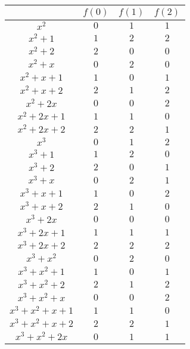 \documentclass{article}
\begin{document}
\begin{table}[h]
    \centering
    \begin{tabular}{|c|c|c|c|}
        \hline 
         & $f(0)$ & $f(1)$ & $f(2)$ \\ 
        \hline 
        $x^2$ & $0$ & $1$ & $1$ \\
        \hline 
        $x^2+1$ & $1$ & $2$ & $2$ \\
        \hline 
        $x^2+2$ & $2$ & $0$ & $0$ \\
        \hline       
        $x^2+x$ & $0$ & $2$ & $0$ \\
        \hline 
        $x^2+x+1$ & $1$ & $0$ & $1$ \\
        \hline
        $x^2+x+2$ & $2$ & $1$ & $2$ \\
        \hline 
        $x^2+2x$ & $0$ & $0$ & $2$ \\ 
        \hline
        $x^2+2x+1$ & $1$ & $1$ & $0$ \\
        \hline 
        $x^2+2x+2$ & $2$ & $2$ & $1$ \\
        \hline 
        $x^3$ & $0$ & $1$ & $2$ \\
        \hline
        $x^3+1$ & $1$ & $2$ & $0$ \\
        \hline
        $x^3+2$ & $2$ & $0$ & $1$ \\
        \hline 
        $x^3+x$ & $0$ & $2$ & $1$ \\
        \hline 
        $x^3+x+1$ & $1$ & $0$ & $2$ \\
        \hline 
        $x^3+x+2$ & $2$ & $1$ & $0$ \\
        \hline 
        $x^3+2x$ & $0$ & $0$ & $0$ \\
        \hline 
        $x^3+2x+1$ & $1$ & $1$ & $1$ \\
        \hline
        $x^3+2x+2$ & $2$ & $2$ & $2$ \\
        \hline 
        $x^3+x^2$ & $0$ & $2$ & $0$ \\
        \hline 
        $x^3+x^2+1$ & $1$ & $0$ & $1$ \\
        \hline 
        $x^3+x^2+2$ & $2$ & $1$ & $2$ \\
        \hline 
        $x^3+x^2+x$ & $0$ & $0$ & $2$ \\
        \hline
        $x^3+x^2+x+1$ & $1$ & $1$ & $0$ \\
        \hline 
        $x^3+x^2+x+2$ & $2$ & $2$ & $1$ \\
        \hline 
        $x^3+x^2+2x$ & $0$ & $1$ & $1$ \\

\end{tabular}
\end{table}
\end{document}
